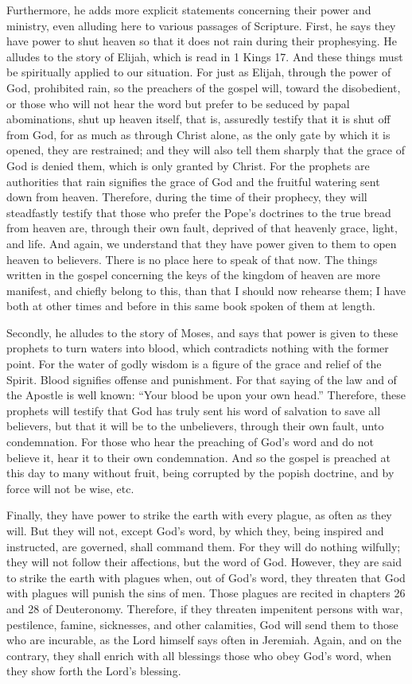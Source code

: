 Furthermore, he adds more explicit statements concerning their power and ministry, even alluding here to various passages of Scripture. First, he says they have power to shut heaven so that it does not rain during their prophesying. He alludes to the story of Elijah, which is read in 1 Kings 17. And these things must be spiritually applied to our situation. For just as Elijah, through the power of God, prohibited rain, so the preachers of the gospel will, toward the disobedient, or those who will not hear the word but prefer to be seduced by papal abominations, shut up heaven itself, that is, assuredly testify that it is shut off from God, for as much as through Christ alone, as the only gate by which it is opened, they are restrained; and they will also tell them sharply that the grace of God is denied them, which is only granted by Christ. For the prophets are authorities that rain signifies the grace of God and the fruitful watering sent down from heaven. Therefore, during the time of their prophecy, they will steadfastly testify that those who prefer the Pope’s doctrines to the true bread from heaven are, through their own fault, deprived of that heavenly grace, light, and life. And again, we understand that they have power given to them to open heaven to believers. There is no place here to speak of that now. The things written in the gospel concerning the keys of the kingdom of heaven are more manifest, and chiefly belong to this, than that I should now rehearse them; I have both at other times and before in this same book spoken of them at length.

Secondly, he alludes to the story of Moses, and says that power is given to these prophets to turn waters into blood, which contradicts nothing with the former point. For the water of godly wisdom is a figure of the grace and relief of the Spirit. Blood signifies offense and punishment. For that saying of the law and of the Apostle is well known: “Your blood be upon your own head.” Therefore, these prophets will testify that God has truly sent his word of salvation to save all believers, but that it will be to the unbelievers, through their own fault, unto condemnation. For those who hear the preaching of God’s word and do not believe it, hear it to their own condemnation. And so the gospel is preached at this day to many without fruit, being corrupted by the popish doctrine, and by force will not be wise, etc.

Finally, they have power to strike the earth with every plague, as often as they will. But they will not, except God’s word, by which they, being inspired and instructed, are governed, shall command them. For they will do nothing wilfully; they will not follow their affections, but the word of God. However, they are said to strike the earth with plagues when, out of God’s word, they threaten that God with plagues will punish the sins of men. Those plagues are recited in chapters 26 and 28 of Deuteronomy. Therefore, if they threaten impenitent persons with war, pestilence, famine, sicknesses, and other calamities, God will send them to those who are incurable, as the Lord himself says often in Jeremiah. Again, and on the contrary, they shall enrich with all blessings those who obey God’s word, when they show forth the Lord’s blessing.

